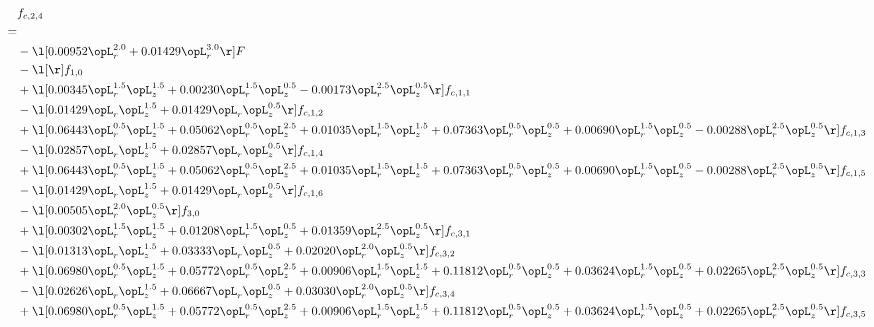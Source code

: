 \begin{alignat}{2} 
\label{eq:f_24_1} 
& f_{c,2,4} \nonumber \\ 
 = \\ 
& - \l[  0.00952 \opL_r^{2.0} +  0.01429 \opL_r^{3.0}  \r] F \nonumber \\ 
& - \l[  \r] f_{1,0} \nonumber \\ 
& + \l[  0.00345 \opL_r^{1.5} \opL_z^{1.5} +  0.00230 \opL_r^{1.5} \opL_z^{0.5}   -0.00173 \opL_r^{2.5} \opL_z^{0.5}  \r] f_{c,1,1} \nonumber \\ 
& - \l[  0.01429 \opL_r \opL_z^{1.5} +  0.01429 \opL_r \opL_z^{0.5}  \r] f_{c,1,2} \nonumber \\ 
& + \l[  0.06443 \opL_r^{0.5} \opL_z^{1.5} +  0.05062 \opL_r^{0.5} \opL_z^{2.5} +  0.01035 \opL_r^{1.5} \opL_z^{1.5} +  0.07363 \opL_r^{0.5} \opL_z^{0.5} +  0.00690 \opL_r^{1.5} \opL_z^{0.5}   -0.00288 \opL_r^{2.5} \opL_z^{0.5}  \r] f_{c,1,3} \nonumber \\ 
& - \l[  0.02857 \opL_r \opL_z^{1.5} +  0.02857 \opL_r \opL_z^{0.5}  \r] f_{c,1,4} \nonumber \\ 
& + \l[  0.06443 \opL_r^{0.5} \opL_z^{1.5} +  0.05062 \opL_r^{0.5} \opL_z^{2.5} +  0.01035 \opL_r^{1.5} \opL_z^{1.5} +  0.07363 \opL_r^{0.5} \opL_z^{0.5} +  0.00690 \opL_r^{1.5} \opL_z^{0.5}   -0.00288 \opL_r^{2.5} \opL_z^{0.5}  \r] f_{c,1,5} \nonumber \\ 
& - \l[  0.01429 \opL_r \opL_z^{1.5} +  0.01429 \opL_r \opL_z^{0.5}  \r] f_{c,1,6} \nonumber \\ 
& - \l[  0.00505 \opL_r^{2.0} \opL_z^{0.5}  \r] f_{3,0} \nonumber \\ 
& + \l[  0.00302 \opL_r^{1.5} \opL_z^{1.5} +  0.01208 \opL_r^{1.5} \opL_z^{0.5} +  0.01359 \opL_r^{2.5} \opL_z^{0.5}  \r] f_{c,3,1} \nonumber \\ 
& - \l[  0.01313 \opL_r \opL_z^{1.5} +  0.03333 \opL_r \opL_z^{0.5} +  0.02020 \opL_r^{2.0} \opL_z^{0.5}  \r] f_{c,3,2} \nonumber \\ 
& + \l[  0.06980 \opL_r^{0.5} \opL_z^{1.5} +  0.05772 \opL_r^{0.5} \opL_z^{2.5} +  0.00906 \opL_r^{1.5} \opL_z^{1.5} +  0.11812 \opL_r^{0.5} \opL_z^{0.5} +  0.03624 \opL_r^{1.5} \opL_z^{0.5} +  0.02265 \opL_r^{2.5} \opL_z^{0.5}  \r] f_{c,3,3} \nonumber \\ 
& - \l[  0.02626 \opL_r \opL_z^{1.5} +  0.06667 \opL_r \opL_z^{0.5} +  0.03030 \opL_r^{2.0} \opL_z^{0.5}  \r] f_{c,3,4} \nonumber \\ 
& + \l[  0.06980 \opL_r^{0.5} \opL_z^{1.5} +  0.05772 \opL_r^{0.5} \opL_z^{2.5} +  0.00906 \opL_r^{1.5} \opL_z^{1.5} +  0.11812 \opL_r^{0.5} \opL_z^{0.5} +  0.03624 \opL_r^{1.5} \opL_z^{0.5} +  0.02265 \opL_r^{2.5} \opL_z^{0.5}  \r] f_{c,3,5} \nonumber \\ 

\end{alignat}

